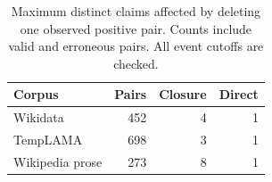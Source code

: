 \begin{table}[t]
\centering
\small
\begin{tabular}{lrrr}
\toprule
Corpus & Pairs & Closure & Direct \\
\midrule
Wikidata & 452 & 4 & 1 \\
TempLAMA & 698 & 3 & 1 \\
Wikipedia prose & 273 & 8 & 1 \\
\bottomrule
\end{tabular}
\caption{Maximum distinct claims affected by deleting one observed positive pair. Counts include valid and erroneous pairs. All event cutoffs are checked.}
\label{tab:sensitivity}
\end{table}
